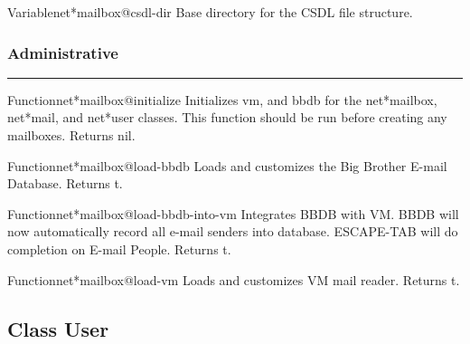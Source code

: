 \begin{functiondoc}{Variable}{net*mailbox@csdl-dir}{}
Base directory for the CSDL file structure.
\end{functiondoc}


\subsubsection*{Administrative}
\par\vspace*{0.00in}\par\hrule\par\medskip\par


\begin{functiondoc}{Function}{net*mailbox@initialize}{}
Initializes vm, and bbdb for the net*mailbox, net*mail, and net*user classes.
This function should be run before creating any mailboxes.
Returns nil.
\end{functiondoc}

\begin{functiondoc}{Function}{net*mailbox@load-bbdb}{}
Loads and customizes the Big Brother E-mail Database.
Returns t.
\end{functiondoc}

\begin{functiondoc}{Function}{net*mailbox@load-bbdb-into-vm}{}
Integrates BBDB with VM.
BBDB will now automatically record all e-mail senders into database.
ESCAPE-TAB will do completion on E-mail People.
Returns t.
\end{functiondoc}

\begin{functiondoc}{Function}{net*mailbox@load-vm}{}
Loads and customizes VM mail reader.
Returns t.
\end{functiondoc}


\clearpage

\subsection{Class User}


